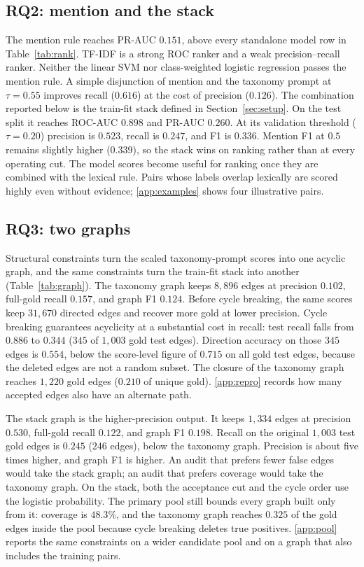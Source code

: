 \documentclass{ws-ijait}
\begin{document}
\subsection{RQ2: mention and the stack}
\label{sec:rq2}
The mention rule reaches {PR}-{AUC} $0.151$, above every standalone
model row in Table~\ref{tab:rank}.
{TF}-{IDF} is a strong {ROC} ranker and a weak precision--recall
ranker.
Neither the linear {SVM} nor class-weighted logistic regression
passes the mention rule.
A simple disjunction of mention and the taxonomy prompt at
$\tau=0.55$ improves recall ($0.616$) at the cost of precision
($0.126$).
The combination reported below is the train-fit stack defined in
Section~\ref{sec:setup}.
On the test split it reaches {ROC}-{AUC} $0.898$ and {PR}-{AUC}
$0.260$.
At its validation threshold ($\tau=0.20$) precision is $0.523$,
recall is $0.247$, and {F1} is $0.336$.
Mention {F1} at $0.5$ remains slightly higher ($0.339$), so the
stack wins on ranking rather than at every operating cut.
The model scores become useful for ranking once they are combined
with the lexical rule.
Pairs whose labels overlap lexically are scored highly even without
evidence; \ref{app:examples} shows four illustrative pairs.

\subsection{RQ3: two graphs}
\label{sec:rq3}
Structural constraints turn the scaled taxonomy-prompt scores into
one acyclic graph, and the same constraints turn the train-fit stack
into another (Table~\ref{tab:graph}).
The taxonomy graph keeps $8{,}896$ edges at precision $0.102$,
full-gold recall $0.157$, and graph {F1} $0.124$.
Before cycle breaking, the same scores keep $31{,}670$ directed
edges and recover more gold at lower precision.
Cycle breaking guarantees acyclicity at a substantial cost in
recall: test recall falls from $0.886$ to $0.344$ ($345$ of
$1{,}003$ gold test edges).
Direction accuracy on those $345$ edges is $0.554$, below the
score-level figure of $0.715$ on all gold test edges, because the
deleted edges are not a random subset.
The closure of the taxonomy graph reaches $1{,}220$ gold edges
($0.210$ of unique gold).
\ref{app:repro} records how many accepted edges also have an
alternate path.

The stack graph is the higher-precision output.
It keeps $1{,}334$ edges at precision $0.530$, full-gold recall
$0.122$, and graph {F1} $0.198$.
Recall on the original $1{,}003$ test gold edges is $0.245$ ($246$
edges), below the taxonomy graph.
Precision is about five times higher, and graph {F1} is higher.
An audit that prefers fewer false edges would take the stack graph;
an audit that prefers coverage would take the taxonomy graph.
On the stack, both the acceptance cut and the cycle order use the
logistic probability.
The primary pool still bounds every graph built only from it:
coverage is $48.3$\%, and the taxonomy graph reaches $0.325$ of the
gold edges inside the pool because cycle breaking deletes true
positives.
\ref{app:pool} reports the same constraints on a wider candidate
pool and on a graph that also includes the training pairs.
\end{document}
